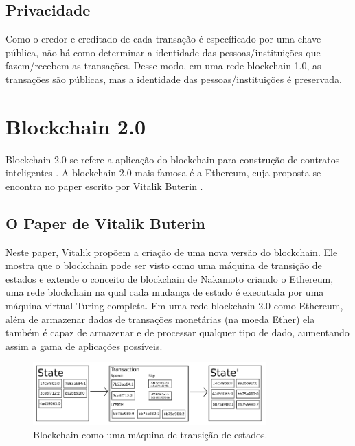 \subsection{Privacidade}

Como o credor e creditado de cada transação é específicado por uma chave pública, não há como determinar a identidade das pessoas/instituições que fazem/recebem as transações. Desse modo, em uma rede blockchain 1.0, as transações são públicas, mas a identidade das pessoas/instituições é preservada.

\section{Blockchain 2.0}

Blockchain 2.0 se refere a aplicação do blockchain para construção de contratos inteligentes \cite{blockchainneweconomy}. A blockchain 2.0 mais famosa é a Ethereum, cuja proposta se encontra no paper escrito por Vitalik Buterin \cite{paper_ethereum}.

\subsection{O Paper de Vitalik Buterin}

Neste paper, Vitalik propõem a criação de uma nova versão do blockchain. Ele mostra que o blockchain pode ser visto como uma máquina de transição de estados e extende o conceito de blockchain de Nakamoto criando o Ethereum, uma rede blockchain na qual cada mudança de estado é executada por uma máquina virtual Turing-completa. Em uma rede blockchain 2.0 como Ethereum, além de armazenar dados de transações monetárias (na moeda Ether) ela também é capaz de armazenar e de processar qualquer tipo de dado, aumentando assim a gama de aplicações possíveis.

\begin{figure}[ht]
\centering
\includegraphics[width=0.8\textwidth]{Cap1/blockchain_as_state_transition_machine}
\caption{Blockchain como uma máquina de transição de estados.}
\label{blockchain_as_state_transition_machine}
\end{figure}


